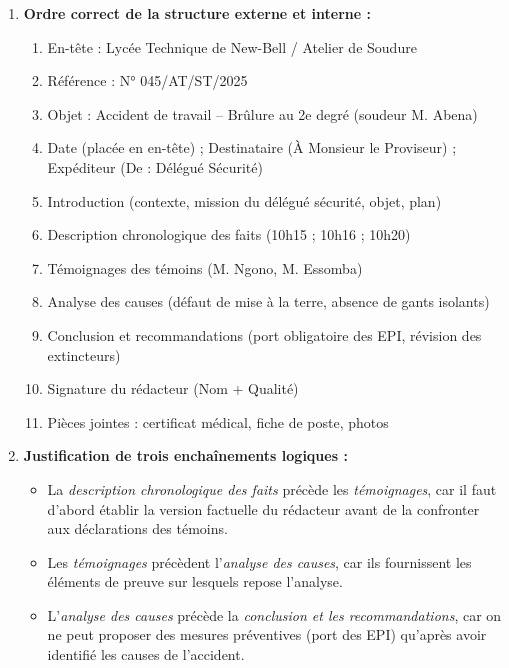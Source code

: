 \documentclass[11pt]{article}
\begin{document}
\begin{corrige}
\begin{enumerate}
    \item \textbf{Ordre correct de la structure externe et interne :}
    \begin{enumerate}
        \item En-tête : Lycée Technique de New-Bell / Atelier de Soudure
        \item Référence : N° 045/AT/ST/2025
        \item Objet : Accident de travail – Brûlure au 2e degré (soudeur M. Abena)
        \item Date (placée en en-tête) ; Destinataire (À Monsieur le Proviseur) ; Expéditeur (De : Délégué Sécurité)
        \item Introduction (contexte, mission du délégué sécurité, objet, plan)
        \item Description chronologique des faits (10h15 ; 10h16 ; 10h20)
        \item Témoignages des témoins (M. Ngono, M. Essomba)
        \item Analyse des causes (défaut de mise à la terre, absence de gants isolants)
        \item Conclusion et recommandations (port obligatoire des EPI, révision des extincteurs)
        \item Signature du rédacteur (Nom + Qualité)
        \item Pièces jointes : certificat médical, fiche de poste, photos
    \end{enumerate}
    \item \textbf{Justification de trois enchaînements logiques :}
    \begin{itemize}
        \item La \emph{description chronologique des faits} précède les \emph{témoignages}, car il faut d'abord établir la version factuelle du rédacteur avant de la confronter aux déclarations des témoins.
        \item Les \emph{témoignages} précèdent l'\emph{analyse des causes}, car ils fournissent les éléments de preuve sur lesquels repose l'analyse.
        \item L'\emph{analyse des causes} précède la \emph{conclusion et les recommandations}, car on ne peut proposer des mesures préventives (port des EPI) qu'après avoir identifié les causes de l'accident.
    \end{itemize}
\end{enumerate}
\end{corrige}
\end{document}

